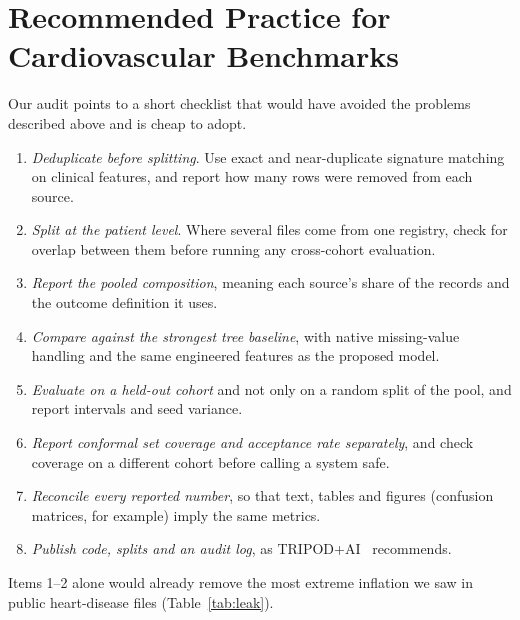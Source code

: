 \documentclass[conference]{IEEEtran}
\begin{document}
\section{Recommended Practice for Cardiovascular Benchmarks}\label{sec:practice}
Our audit points to a short checklist that would have avoided the problems described above and is cheap to adopt.
\begin{enumerate}
\item \emph{Deduplicate before splitting}. Use exact and near-duplicate signature matching on clinical features, and report how many rows were removed from each source.
\item \emph{Split at the patient level}. Where several files come from one registry, check for overlap between them before running any cross-cohort evaluation.
\item \emph{Report the pooled composition}, meaning each source's share of the records and the outcome definition it uses.
\item \emph{Compare against the strongest tree baseline}, with native missing-value handling and the same engineered features as the proposed model.
\item \emph{Evaluate on a held-out cohort} and not only on a random split of the pool, and report intervals and seed variance.
\item \emph{Report conformal set coverage and acceptance rate separately}, and check coverage on a different cohort before calling a system safe.
\item \emph{Reconcile every reported number}, so that text, tables and figures (confusion matrices, for example) imply the same metrics.
\item \emph{Publish code, splits and an audit log}, as TRIPOD+AI~\cite{collins2024} recommends.
\end{enumerate}
Items 1--2 alone would already remove the most extreme inflation we saw in public heart-disease files (Table~\ref{tab:leak}).

\end{document}
